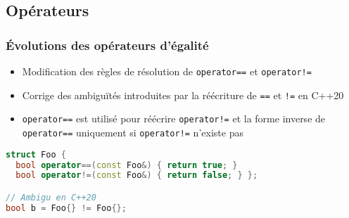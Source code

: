 \documentclass[C++.tex]{subfiles}
\begin{document}
\subsection*{Opérateurs}
\begin{frame}[fragile]
	\frametitle{Évolutions des opérateurs d'égalité}
	\begin{itemize}
		\item Modification des règles de résolution de \lstinline|operator==| et \lstinline|operator!=|
		\item Corrige des ambiguïtés introduites par la réécriture de \lstinline|==| et \lstinline|!=| en C++20


		\item \lstinline|operator==| est utilisé pour réécrire \lstinline|operator!=| et la forme inverse de \lstinline|operator==| uniquement si \lstinline|operator!=| n'existe pas 
	\end{itemize}

\begin{lstlisting}[language=C++]
struct Foo {
  bool operator==(const Foo&) { return true; }
  bool operator!=(const Foo&) { return false; } };

// Ambigu en C++20
bool b = Foo{} != Foo{};\end{lstlisting}

\end{frame}
\end{document}
